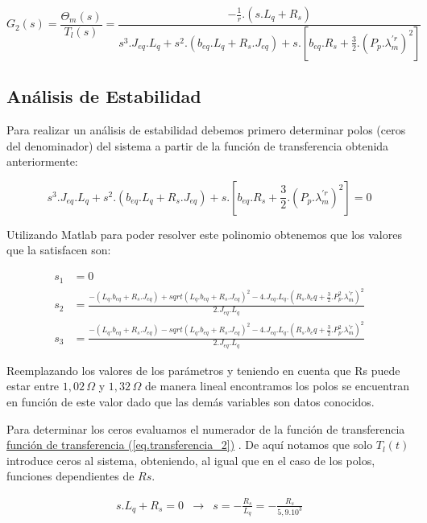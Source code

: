 \documentclass{article}
\begin{document}
\begin{equation}\label{eq.transferencia_2}
    G_{2}(s) = \frac{\Theta_{m}(s)}{T_{l}(s)} = \frac{- \frac{1}{r}.(s.L_{q}+R_{s})}{s^3.J_{eq}.L_{q} + s^2.(b_{eq}.L_{q} +  R_{s}.J_{eq}) + s.[b_{eq}.R_{s}+\frac{3}{2}.(P_{p}.\lambda_{m}^{\prime r})^2]}
\end{equation}


\subsection{Análisis de Estabilidad}

Para realizar un análisis de estabilidad debemos primero determinar polos (ceros del denominador) del 
sistema a partir de la función de transferencia obtenida anteriormente:

\begin{equation}
    s^3.J_{eq}.L_{q} + s^2.(b_{eq}.L_{q} +  R_{s}.J_{eq}) + s.[b_{eq}.R_{s}+\frac{3}{2}.(P_{p}.\lambda_{m}^{\prime r})^2] = 0
\end{equation}

Utilizando Matlab para poder resolver este polinomio obtenemos que los valores que la satisfacen son:

\begin{align*}
    s_{1} &= 0\\
    s_{2} &= \frac{-(L_q.b_{eq} + R_s.J_{eq}) + sqrt{(L_q.b_{eq} + R_s.J_{eq})^2 - 4.J_{eq}.L_q.(R_s.b_eq + \frac{3}{2}.P_p^2.\lambda_{m}^{\prime r})^2}}{2.J_{eq}.L_q}\\
    s_{3} &= \frac{-(L_q.b_{eq} + R_s.J_{eq}) - sqrt{(L_q.b_{eq} + R_s.J_{eq})^2 - 4.J_{eq}.L_q.(R_s.b_eq + \frac{3}{2}.P_p^2.\lambda_{m}^{\prime r})^2}}{2.J_{eq}.L_q}
\end{align*}

Reemplazando los valores de los parámetros y teniendo en cuenta que Rs puede estar entre 
$1,02\, \Omega$ y $1,32\, \Omega$ de manera lineal encontramos los polos se encuentran en 
función de este valor dado que las demás variables son datos conocidos.

Para determinar los ceros evaluamos  el numerador de la función de transferencia
\hyperref[eq.transferencia_2]{función de transferencia (\ref*{eq.transferencia_2})}
. De aquí notamos que solo $T_l(t)$ introduce ceros al sistema, obteniendo, al igual que en el caso 
de los polos, funciones dependientes de $Rs$.

\begin{align*}
    s.L_q+ R_s = 0 &\to& s = - \frac{R_s}{L_q} = - \frac{R_s}{5,9.10^3}\\ 
\end{align*}
\end{document}
